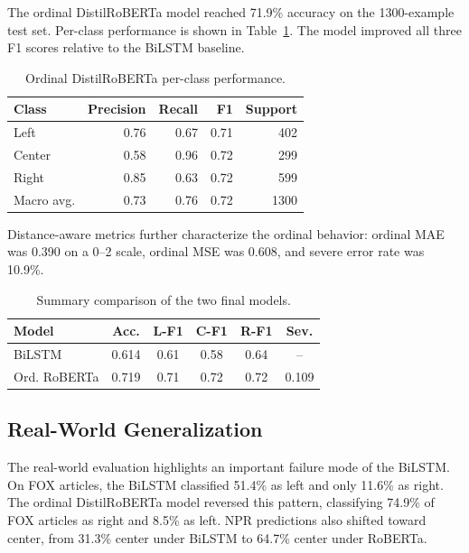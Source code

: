 \documentclass[10pt,twocolumn]{article}
\begin{document}
The ordinal DistilRoBERTa model reached 71.9\% accuracy on the 1300-example
test set. Per-class performance is shown in Table~\ref{tab:roberta-results}.
The model improved all three F1 scores relative to the BiLSTM baseline.

\begin{table}[h]
\centering
\caption{Ordinal DistilRoBERTa per-class performance.}
\label{tab:roberta-results}
\begin{tabular}{lrrrr}
\toprule
Class & Precision & Recall & F1 & Support \\
\midrule
Left & 0.76 & 0.67 & 0.71 & 402 \\
Center & 0.58 & 0.96 & 0.72 & 299 \\
Right & 0.85 & 0.63 & 0.72 & 599 \\
\midrule
Macro avg. & 0.73 & 0.76 & 0.72 & 1300 \\
\bottomrule
\end{tabular}
\end{table}

Distance-aware metrics further characterize the ordinal behavior: ordinal MAE
was 0.390 on a 0--2 scale, ordinal MSE was 0.608, and severe error rate was
10.9\%.

\begin{table}[h]
\centering
\small
\setlength{\tabcolsep}{3pt}
\caption{Summary comparison of the two final models.}
\label{tab:comparison}
\begin{tabular}{@{}lccccc@{}}
\toprule
Model & Acc. & L-F1 & C-F1 & R-F1 & Sev. \\
\midrule
BiLSTM & 0.614 & 0.61 & 0.58 & 0.64 & -- \\
Ord. RoBERTa & 0.719 & 0.71 & 0.72 & 0.72 & 0.109 \\
\bottomrule
\end{tabular}
\end{table}

\subsection{Real-World Generalization}

The real-world evaluation highlights an important failure mode of the BiLSTM.
On FOX articles, the BiLSTM classified 51.4\% as left and only 11.6\% as right.
The ordinal DistilRoBERTa model reversed this pattern, classifying 74.9\% of
FOX articles as right and 8.5\% as left. NPR predictions also shifted toward
center, from 31.3\% center under BiLSTM to 64.7\% center under RoBERTa.
\end{document}
